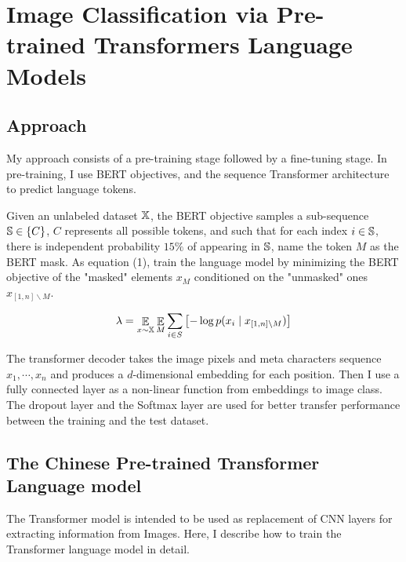 \documentclass[10pt,twocolumn,letterpaper]{article}
\begin{document}

\section{Image Classification via Pre-trained Transformers Language Models}


\subsection{Approach}

My approach consists of a pre-training stage followed by a fine-tuning stage.
In pre-training, I use BERT objectives, and the sequence Transformer architecture to predict language tokens.

\par Given an unlabeled dataset $\Bbb X$, the BERT objective samples a sub-sequence $\Bbb S \in \{C\}$,
$C$ represents all possible tokens, and such that for each index $i \in \Bbb S$,
there is independent probability $15\%$ of appearing in $\Bbb S$,
name the token $M$ as the BERT mask.
As equation (1), train the language model by minimizing the BERT objective of the "masked" elements $x_M$
conditioned on the "unmasked" ones $x_{\left[1,n\right]\backslash M}$.

\begin{equation}
  \lambda = \mathop{\Bbb E}\limits_{x\sim\Bbb X} \mathop{\Bbb E}\limits_{M} \sum_{i\in S}{\bigl[-\log{p(x_i\mid x_{\left[1,n \right]\backslash M})\bigr]}}
\end{equation}

\par The transformer decoder takes the image pixels and meta characters sequence $x_1,\cdots,x_n$ and produces a $d$-dimensional
embedding for each position.
Then I use a fully connected layer as a non-linear function from embeddings to image class.
The dropout layer and the Softmax layer are used for better transfer performance between the training and the test dataset.

\subsection{The Chinese Pre-trained Transformer Language model}

\par The Transformer model is intended to be used as replacement of CNN layers for extracting information from Images.
Here, I describe how to train the Transformer language model in detail.
\end{document}
